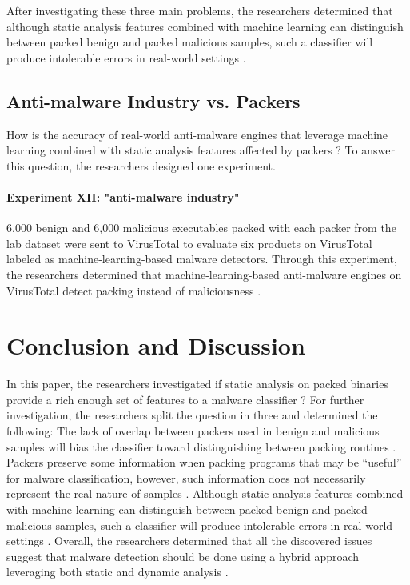 \documentclass[sigconf]{acmart}
\begin{document}
After investigating these three main problems, the researchers determined that although static analysis features combined with machine learning can distinguish between packed benign and packed malicious samples, such a classifier will produce intolerable errors in real-world settings \cite{Aghakhani2020}.

\subsection{Anti-malware Industry vs. Packers}
How is the accuracy of real-world anti-malware engines that leverage machine learning combined with static analysis features affected by packers \cite{Aghakhani2020}? To answer this question, the researchers designed one experiment.
\paragraph{Experiment XII: "anti-malware industry"}
6,000 benign and 6,000 malicious executables packed with each packer from the lab dataset were sent to VirusTotal to evaluate six products on VirusTotal labeled as machine-learning-based malware detectors.
Through this experiment, the researchers determined that machine-learning-based anti-malware engines on VirusTotal detect packing instead of maliciousness \cite{Aghakhani2020}.

\section{Conclusion and Discussion}
In this paper, the researchers investigated if static analysis on packed binaries provide a rich enough set of features to a malware classifier \cite{Aghakhani2020}?
For further investigation, the researchers split the question in three and determined the following:
The lack of overlap between packers used in benign and malicious samples will bias the classifier toward distinguishing between packing routines \cite{Aghakhani2020}.
Packers preserve some information when packing programs that may be “useful” for malware classification, however, such information does not necessarily represent the real nature of samples \cite{Aghakhani2020}.
Although static analysis features combined with machine learning can distinguish between packed benign and packed malicious samples, such a classifier will produce intolerable errors in real-world settings \cite{Aghakhani2020}.
Overall, the researchers determined that all the discovered issues suggest that malware detection should be done using a hybrid approach leveraging both static and dynamic analysis \cite{Aghakhani2020}.
\label{sec:conclusion}


 
% 

\newpage

%
\end{document}
